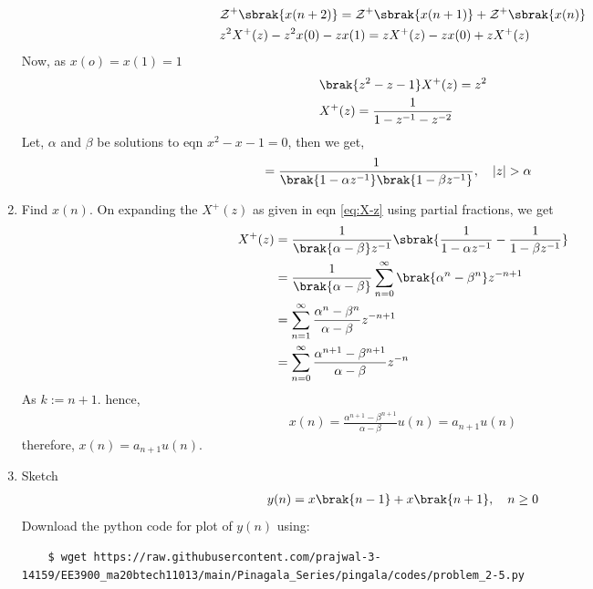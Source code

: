 \documentclass[journal,12pt,twocolumn]{IEEEtran}
\renewcommand\thesection{\arabic{section}}
\begin{document}
\begin{enumerate}[label=\thesection.\arabic*,ref=\thesection.\theenumi]
\begin{align}
	&\mathcal{Z}^+\sbrak{x(n + 2)} = \mathcal{Z}^+\sbrak{x(n + 1)} + \mathcal{Z}^+\sbrak{x(n)} \\
	&z^2X^+(z) - z^2x(0) - zx(1)  = zX^+(z) - zx(0) + zX^+(z) 
\end{align}
Now, as $x(o) = x(1) = 1$
\begin{align}
	&\brak{z^2 - z - 1}X^+(z) = z^2 \\
	&X^+(z) = \frac{1}{1 - z^{-1} - z^{-2}} 
\end{align}
Let, $\alpha$ and $\beta$ be solutions to eqn $x^2 - x - 1 = 0$,
then we get, 
\begin{align}
	&= \frac{1}{\brak{1 - \alpha z^{-1}}\brak{1 - \beta z^{-1}}}, \quad |z| > \alpha
	\label{eq:X-z}
\end{align}
\break
\item Find $x(n)$.
\solution On expanding the $X^+(z)$ as given in eqn \eqref{eq:X-z} using partial fractions, we get
\begin{align}
	X^+(z) &= \frac{1}{\brak{\alpha - \beta}z^{-1}}\sbrak{\frac{1}{1 - \alpha z^{-1}} - \frac{1}{1 - \beta z^{-1}}} \\
	&= \frac{1}{\brak{\alpha - \beta}}\sum_{n = 0}^{\infty}\brak{\alpha^n - \beta^n}z^{-n + 1} \\
	&= \sum_{n = 1}^{\infty}\frac{\alpha^{n} - \beta^{n}}{\alpha - \beta}z^{-n + 1} \\
	&= \sum_{n = 0}^{\infty}\frac{\alpha^{n + 1} - \beta^{n + 1}}{\alpha - \beta}z^{-n}
\end{align}
As $k := n + 1$. hence,
\begin{align}
	x(n) = \frac{\alpha^{n + 1} - \beta^{n + 1}}{\alpha - \beta}u(n) = a_{n + 1}u(n)
	\label{eq:x-n-def}
\end{align}
therefore, $x(n) = a_{n+1} u(n)$.
\item Sketch 
\begin{align}
	y(n) = x\brak{n-1} + x\brak{n+1},  \quad n \ge 0
	\label{eq:10-orig-diff-rev}
\end{align}
\solution Download the python code for plot of $y(n)$ using:
\begin{lstlisting}
	$ wget https://raw.githubusercontent.com/prajwal-3-14159/EE3900_ma20btech11013/main/Pinagala_Series/pingala/codes/problem_2-5.py
\end{lstlisting}
\begin{figure}[!ht]
	\centering

\end{figure}
\end{enumerate}
\end{document}
